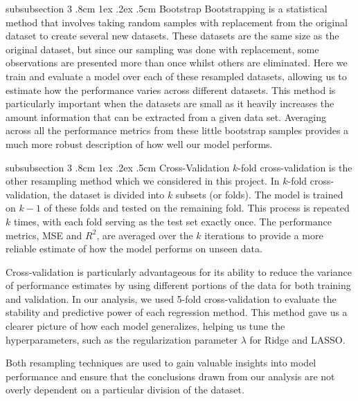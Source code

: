 \documentclass[%
reprint,
amsmath,amssymb,
aps,
pra,
]{revtex4-2}
\makeatletter
\renewcommand{\subsubsection}{%
	\@startsection
	{subsubsection}%
	{3}%
	{\z@}%
	{.8cm \@plus1ex \@minus .2ex}%
	{.5cm}%
	{\normalfont\small\centering}%
}
\makeatother
\begin{document}
\subsubsection{Bootstrap} 
Bootstrapping is a statistical method that involves taking random samples with replacement from the original dataset to create several new datasets. These datasets are the same size as the original dataset, but since our sampling was done with replacement, some observations are presented more than once whilst others are eliminated. Here we train and evaluate a model over each of these resampled datasets, allowing us to estimate how the performance varies across different datasets. This method is particularly important when the datasets are small as it heavily increases the amount information that can be extracted from a given data set. Averaging across all the performance metrics from these little bootstrap samples provides a much more robust description of how well our model performs. 

\subsubsection{Cross-Validation} 
$k$-fold cross-validation is the other resampling method which we considered in this project. In $k$-fold cross-validation, the dataset is divided into $k$ subsets (or folds). The model is trained on $k-1$ of these folds and tested on the remaining fold. This process is repeated $k$ times, with each fold serving as the test set exactly once. The performance metrics, MSE and $R^2$, are averaged over the $k$ iterations to provide a more reliable estimate of how the model performs on unseen data.

Cross-validation is particularly advantageous for its ability to reduce the variance of performance estimates by using different portions of the data for both training and validation. In our analysis, we used 5-fold cross-validation to evaluate the stability and predictive power of each regression method. This method gave us a clearer picture of how each model generalizes, helping us tune the hyperparameters, such as the regularization parameter $\lambda$ for Ridge and LASSO.

Both resampling techniques are used to gain valuable insights into model performance and ensure that the conclusions drawn from our analysis are not overly dependent on a particular division of the dataset.
\end{document}

